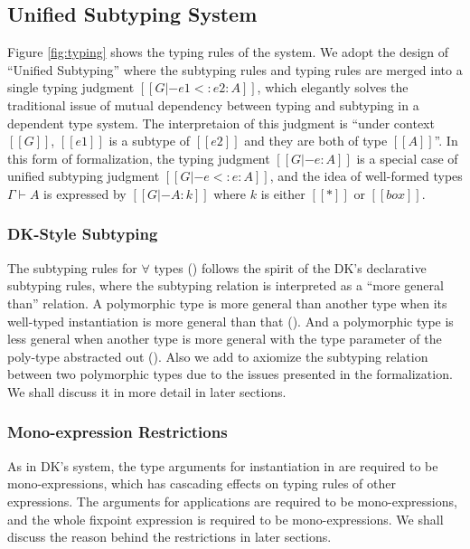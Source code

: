 \documentclass{llncs}
\begin{document}
\subsection{Unified Subtyping System}

Figure \ref{fig:typing} shows the typing rules of the system. We adopt the design
of ``Unified Subtyping''\cite{yang2017unifying} where the subtyping rules and
typing rules are merged into a single typing judgment $[[G |- e1 <: e2 : A]]$,
which elegantly solves the traditional issue of mutual dependency between typing
and subtyping in a dependent type system.
The interpretaion of this judgment is ``under context $[[G]]$, $[[e1]]$ is a
subtype of $[[e2]]$ and they are both of type $[[A]]$''.
In this form of formalization, the typing judgment $[[G |- e : A]]$ is a
special case of unified subtyping judgment $[[G |- e <: e : A]]$,
and the idea of well-formed types $\Gamma \vdash A$ is expressed by
$[[G |- A : k]]$ where $k$ is either $[[*]]$ or $[[box]]$.

\subsubsection{DK-Style Subtyping}

The subtyping rules for $\forall$ types () follows
the spirit of the DK's declarative subtyping rules\cite{DunfieldJoshua2013Caeb},
where the subtyping relation is interpreted as a ``more general than'' relation.
A polymorphic type is more general than another type when its well-typed
instantiation is more general than that (). And a polymorphic
type is less general when another type is more general with the type parameter of
the poly-type abstracted out (). Also we add 
to axiomize the subtyping relation between two polymorphic types due to the
issues presented in the formalization.
We shall discuss it in more detail in later sections.


\subsubsection{Mono-expression Restrictions}

As in DK's system, the type arguments for instantiation in  are
required to be mono-expressions, which has cascading effects on typing rules of
other expressions. The arguments for applications are required to be
mono-expressions, and the whole fixpoint expression is required to be mono-expressions. We shall
discuss the reason behind the restrictions in later sections.
\end{document}
